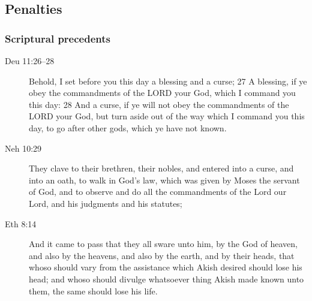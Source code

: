 	\subsection{Penalties} %

		\subsubsection{Scriptural precedents}

			\begin{description}
			\item[Deu 11:26--28] Behold, I set before you this day a blessing and a curse; 27 A blessing, if ye obey the commandments of the LORD your God, which I command you this day: 28 And a curse, if ye will not obey the commandments of the LORD your God, but turn aside out of the way which I command you this day, to go after other gods, which ye have not known.
			\item[Neh 10:29] They clave to their brethren, their nobles, and entered into a curse, and into an oath, to walk in God's law, which was given by Moses the servant of God, and to observe and do all the commandments of the Lord our Lord, and his judgments and his statutes;
			\item[Eth 8:14] And it came to pass that they all sware unto him, by the God of heaven, and also by the heavens, and also by the earth, and by their heads, that whoso should vary from the assistance which Akish desired should lose his head; and whoso should divulge whatsoever thing Akish made known unto them, the same should lose his life.
			\end{description}